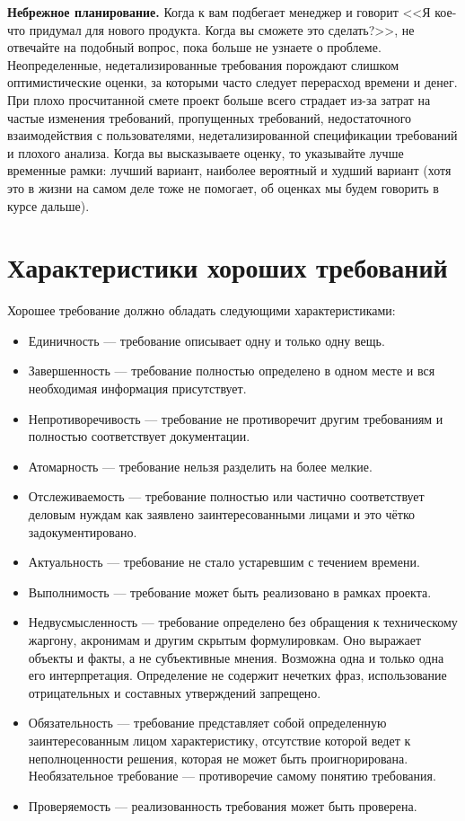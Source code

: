 \documentclass{../../text-style}
\begin{document}
\textbf{Небрежное планирование.} Когда к вам подбегает менеджер и говорит <<Я кое-что придумал для нового продукта. Когда вы сможете это сделать?>>, не отвечайте на подобный вопрос, пока больше не узнаете о проблеме. Неопределенные, недетализированные требования порождают слишком оптимистические оценки, за которыми часто следует перерасход времени и денег. При плохо просчитанной смете проект больше всего страдает из-за затрат на частые изменения требований, пропущенных требований, недостаточного взаимодействия с пользователями, недетализированной спецификации требований и плохого анализа. Когда вы высказываете оценку, то указывайте лучше временные рамки: лучший вариант, наиболее вероятный и худший вариант (хотя это в жизни на самом деле тоже не помогает, об оценках мы будем говорить в курсе дальше).

\section{Характеристики хороших требований}
Хорошее требование должно обладать следующими характеристиками:

\begin{itemize}
    \item Единичность --- требование описывает одну и только одну вещь.
    \item Завершенность --- требование полностью определено в одном месте и вся необходимая информация присутствует.
    \item Непротиворечивость --- требование не противоречит другим требованиям и полностью соответствует документации.
    \item Атомарность --- требование нельзя разделить на более мелкие.
    \item Отслеживаемость --- требование полностью или частично соответствует деловым нуждам как заявлено заинтересованными лицами и это чётко задокументировано.
    \item Актуальность --- требование не стало устаревшим с течением времени.
    \item Выполнимость --- требование может быть реализовано в рамках проекта.
    \item Недвусмысленность --- требование определено без обращения к техническому жаргону, акронимам и другим скрытым формулировкам. Оно выражает объекты и факты, а не субъективные мнения. Возможна одна и только одна его интерпретация. Определение не содержит нечетких фраз, использование отрицательных и составных утверждений запрещено.
    \item Обязательность --- требование представляет собой определенную заинтересованным лицом характеристику, отсутствие которой ведет к неполноценности решения, которая не может быть проигнорирована. Необязательное требование --- противоречие самому понятию требования.
    \item Проверяемость --- реализованность требования может быть проверена.
\end{itemize}
\end{document}
